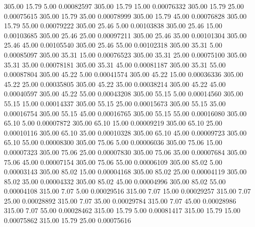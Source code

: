     305.00     15.79      5.00     0.00082597
    305.00     15.79     15.00     0.00076332
    305.00     15.79     25.00     0.00075615
    305.00     15.79     35.00     0.00078999
    305.00     15.79     45.00     0.00076828
    305.00     15.79     55.00     0.00079222
    305.00     25.46      5.00     0.00103838
    305.00     25.46     15.00     0.00103685
    305.00     25.46     25.00     0.00097211
    305.00     25.46     35.00     0.00101304
    305.00     25.46     45.00     0.00105540
    305.00     25.46     55.00     0.00102318
    305.00     35.31      5.00     0.00085097
    305.00     35.31     15.00     0.00076523
    305.00     35.31     25.00     0.00075100
    305.00     35.31     35.00     0.00078181
    305.00     35.31     45.00     0.00081187
    305.00     35.31     55.00     0.00087804
    305.00     45.22      5.00     0.00041574
    305.00     45.22     15.00     0.00036336
    305.00     45.22     25.00     0.00035805
    305.00     45.22     35.00     0.00038214
    305.00     45.22     45.00     0.00040597
    305.00     45.22     55.00     0.00043208
    305.00     55.15      5.00     0.00014560
    305.00     55.15     15.00     0.00014337
    305.00     55.15     25.00     0.00015673
    305.00     55.15     35.00     0.00016754
    305.00     55.15     45.00     0.00016765
    305.00     55.15     55.00     0.00016080
    305.00     65.10      5.00     0.00007872
    305.00     65.10     15.00     0.00009219
    305.00     65.10     25.00     0.00010116
    305.00     65.10     35.00     0.00010328
    305.00     65.10     45.00     0.00009723
    305.00     65.10     55.00     0.00008300
    305.00     75.06      5.00     0.00006036
    305.00     75.06     15.00     0.00007323
    305.00     75.06     25.00     0.00007830
    305.00     75.06     35.00     0.00007684
    305.00     75.06     45.00     0.00007154
    305.00     75.06     55.00     0.00006109
    305.00     85.02      5.00     0.00003143
    305.00     85.02     15.00     0.00004168
    305.00     85.02     25.00     0.00004119
    305.00     85.02     35.00     0.00004332
    305.00     85.02     45.00     0.00004996
    305.00     85.02     55.00     0.00004108
    315.00      7.07      5.00     0.00029516
    315.00      7.07     15.00     0.00029257
    315.00      7.07     25.00     0.00028892
    315.00      7.07     35.00     0.00029784
    315.00      7.07     45.00     0.00028986
    315.00      7.07     55.00     0.00028462
    315.00     15.79      5.00     0.00081417
    315.00     15.79     15.00     0.00075862
    315.00     15.79     25.00     0.00075616
